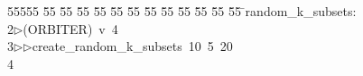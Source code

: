 %
%
\begin{tabbing}
55555 \= 55 \= 55 \= 55 \= 55 \= 55 \= 55 \= 55 \= 55 \= 55 \= 55 \= 55 \= 55 \= \>random\_k\_subsets:\\[0pt]
2\>$\triangleright$\>(ORBITER)\ v\ 4\ \\[0pt]
3\>$\triangleright$\>$\triangleright$\>create\_random\_k\_subsets\ 10\ 5\ 20\\[0pt]
4\>\end{tabbing}
